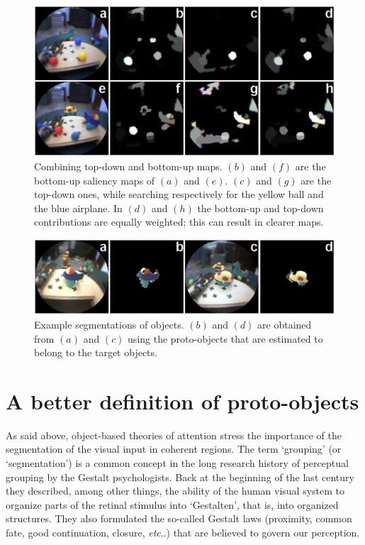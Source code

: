 \documentclass{llncs}
\makeatletter
\DeclareRobustCommand\onedot{\futurelet\@let@token\@onedot}
\def\@onedot{\ifx\@let@token.\else.\null\fi\xspace}
\def\etc{\emph{etc}\onedot} \def\vs{\emph{vs}\onedot}
\makeatother
\begin{document}
\begin{figure}[t]
  \begin{center}
    \includegraphics[width=0.9\linewidth]{./figs/attention/topdown_bottomup}
    \caption{Combining top-down and bottom-up maps. $(b)$ and $(f)$ are the 
     bottom-up saliency maps of $(a)$ and $(e)$. $(c)$ and $(g)$ are the top-down
	   ones, while searching respectively for the yellow ball and the blue airplane.
	   In $(d)$ and $(h)$ the bottom-up and top-down contributions are
	   equally weighted; this can result in clearer maps.}
    \label{fig:out_ex2}
  \end{center}
\end{figure}

\begin{figure}[t]
  \begin{center}
    \includegraphics[width=0.9\linewidth]{./figs/attention/segmentazioni}
    \caption{Example segmentations of objects.
     $(b)$ and $(d)$ are obtained from $(a)$ and $(c)$ using the proto-objects that are estimated to belong to the target objects.}
     \label{fig:segment_ex}
  \end{center}
\end{figure}


\section{A better definition of proto-objects}
\label{sec:ass_fields}
As said above, object-based theories of attention stress the importance
of the segmentation of the visual input in coherent regions.
The term `grouping' (or `segmentation')
is a common concept in the long research history of perceptual grouping
by the Gestalt psychologists.
Back at the beginning of the last century they
described, among other things, the ability of the human
visual system to organize parts of the retinal stimulus
into `Gestalten', that is, into organized structures.
They also formulated the so-called Gestalt laws 
(proximity, common fate, good continuation, closure, \etc)
that are believed to govern our perception.
\end{document}
